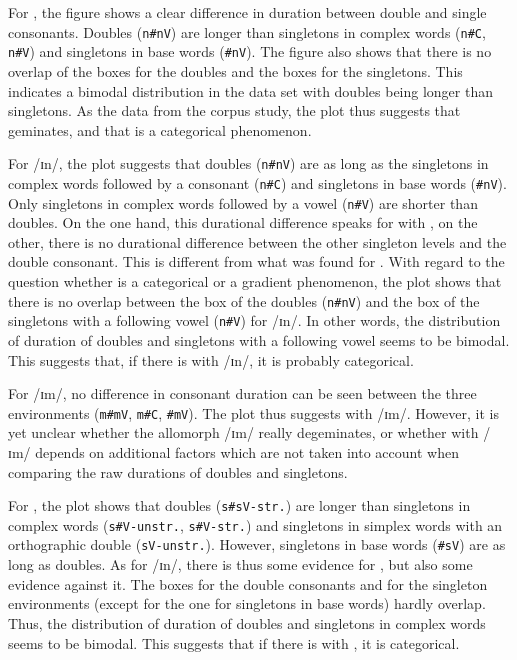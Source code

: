 For ,  the figure shows a clear difference in duration between double and single consonants. Doubles (\texttt{n\#nV}) are longer than singletons in complex words (\texttt{n\#C}, \texttt{n\#V}) and singletons in base words (\texttt{\#nV}). 
  The figure also shows that there is no overlap of the boxes for the doubles and the boxes for the singletons. This indicates a bimodal distribution in the data set with doubles being longer than singletons. 
As the data from the corpus study, the  plot thus suggests that  geminates, and that  is a categorical phenomenon. 



For /ɪn/, the plot suggests that doubles (\texttt{n\#nV}) are as long as the singletons in complex words followed by a consonant (\texttt{n\#C}) and singletons in base words (\texttt{\#nV}). Only singletons in complex words followed by a vowel (\texttt{n\#V}) are shorter than doubles. 
On the one hand, this durational difference speaks for  with , on the other, there is no durational difference between the other singleton levels and the double consonant. This is different from what was found for .
With regard to the question whether  is a categorical or a gradient phenomenon, the plot shows that there is no overlap between the box of the doubles (\texttt{n\#nV}) and the box of the singletons with a following vowel (\texttt{n\#V}) for /ɪn/. In other words, the distribution of duration of doubles and singletons with a following vowel seems to be bimodal. This suggests that, if there is  with /ɪn/, it is probably categorical.

For /ɪm/, no difference in consonant duration can be seen between the three environments (\texttt{m\#mV}, \texttt{m\#C}, \texttt{\#mV}). The plot thus suggests  with /ɪm/. However, 
it is yet unclear whether the allomorph /ɪm/  really degeminates, or whether  with /ɪm/  depends on additional factors which are not taken into account when comparing the raw durations of doubles and singletons. 


For , the plot shows that doubles (\texttt{s\#sV-str.})  are longer than singletons in complex words (\texttt{s\#V-unstr.}, \texttt{s\#V-str.}) and singletons in simplex words with an orthographic double (\texttt{sV-unstr.}). However, singletons in base words (\texttt{\#sV}) are as long as doubles. 
As for /ɪn/, there is thus some evidence for , but also some evidence against it.  
The boxes for the double consonants and  for the singleton environments (except for the one for singletons in base words)  hardly overlap. Thus, the distribution of duration of doubles and singletons in complex words seems to be bimodal. This suggests that if there is  with , it is categorical.


